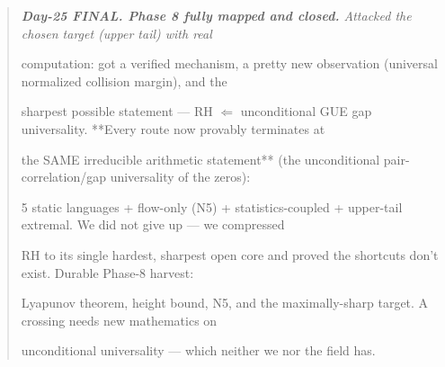\documentclass[10pt]{article}
\begin{document}
\begin{quote}\itshape
\textbf{Day-25 FINAL. Phase 8 fully mapped and closed.} Attacked the chosen target (upper tail) with real\par
computation: got a verified mechanism, a pretty new observation (universal normalized collision margin), and the\par
sharpest possible statement --- RH \ensuremath{\Leftarrow} unconditional GUE gap universality. **Every route now provably terminates at\par
the SAME irreducible arithmetic statement** (the unconditional pair-correlation/gap universality of the zeros):\par
5 static languages + flow-only (N5) + statistics-coupled + upper-tail extremal. We did not give up --- we compressed\par
RH to its single hardest, sharpest open core and proved the shortcuts don't exist. Durable Phase-8 harvest:\par
Lyapunov theorem, height bound, N5, and the maximally-sharp target. A crossing needs new mathematics on\par
unconditional universality --- which neither we nor the field has.\par
\end{quote}
\end{document}
